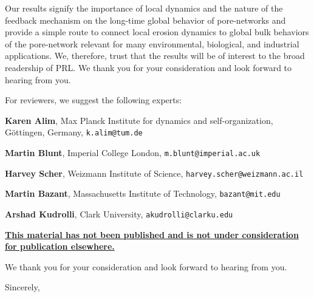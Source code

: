 \documentclass[11pt]{harvardletter}
\begin{document}
\begin{letter}{}
Our results signify the importance of local dynamics and the nature of the feedback mechanism on the long-time global behavior of pore-networks and provide a simple route to connect local erosion dynamics to global bulk behaviors of the pore-network relevant for many environmental, biological, and industrial applications. We, therefore, trust that the results will be of interest to the broad readership of PRL.  We thank you for your consideration and look forward to hearing from you.


For reviewers, we suggest the following experts:

\textbf{Karen Alim}, Max Planck Institute for dynamics and self-organization, G\"ottingen, Germany, \texttt{k.alim@tum.de}

\textbf{Martin Blunt}, Imperial College London, \texttt{m.blunt@imperial.ac.uk}

\textbf{Harvey Scher}, Weizmann Institute of Science, \texttt{harvey.scher@weizmann.ac.il}

\textbf{Martin Bazant}, Massachusetts Institute of Technology, \texttt{bazant@mit.edu}

\textbf{Arshad Kudrolli}, Clark University, \texttt{akudrolli@clarku.edu}


\vspace{5mm}

\underline{\textbf{\small{This material has not been published and is not under consideration for publication elsewhere.}}}

\vspace{5mm}

We thank you for your consideration and look forward to hearing from you.


\vspace{5mm}

\closing{Sincerely,}



\end{letter}
\end{document}
